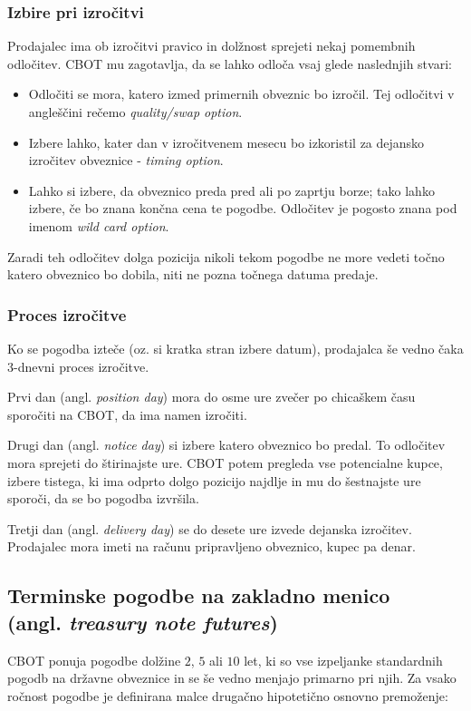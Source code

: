 \documentclass[a4paper, 11pt]{article}
\begin{document}
\subsubsection{Izbire pri izročitvi}
Prodajalec ima ob izročitvi pravico in dolžnost sprejeti nekaj pomembnih odločitev. CBOT mu 
zagotavlja, da se lahko odloča vsaj glede naslednjih stvari:

\begin{itemize}
    \item Odločiti se mora, katero izmed primernih obveznic bo izročil. Tej odločitvi v angleščini 
            rečemo \textit{quality/swap option}.
    \item Izbere lahko, kater dan v izročitvenem mesecu bo izkoristil za dejansko izročitev
            obveznice - \textit{timing option}.
    \item Lahko si izbere, da obveznico preda pred ali po zaprtju borze; tako lahko izbere, če 
            bo znana končna cena te pogodbe. Odločitev je pogosto znana pod imenom
             \textit{wild card option}. 
\end{itemize}

Zaradi teh odločitev dolga pozicija nikoli tekom pogodbe ne more vedeti točno katero obveznico bo
dobila, niti ne pozna točnega datuma predaje.

\subsubsection{Proces izročitve}
Ko se pogodba izteče (oz. si kratka stran izbere datum), prodajalca še vedno čaka 3-dnevni proces 
izročitve. 

Prvi dan (angl. \textit{position day}) mora do osme ure zvečer po chicaškem času sporočiti na 
CBOT, da ima namen izročiti. 

Drugi dan (angl. \textit{notice day}) si izbere katero obveznico bo predal. To odločitev mora 
sprejeti do štirinajste ure. CBOT potem pregleda vse potencialne kupce, izbere tistega, ki 
ima odprto dolgo pozicijo najdlje in mu do šestnajste ure sporoči, da se bo pogodba izvršila. 

Tretji dan (angl. \textit{delivery day}) se do desete ure izvede dejanska izročitev. Prodajalec 
mora imeti na računu pripravljeno obveznico, kupec pa denar. 


\subsection{Terminske pogodbe na zakladno menico \\ (angl. \textit{treasury note futures})}
CBOT ponuja pogodbe dolžine $2$, $5$ ali $10$ let, ki so vse izpeljanke standardnih pogodb na 
državne obveznice in se še vedno menjajo primarno pri njih. Za vsako ročnost pogodbe je 
definirana malce drugačno hipotetično osnovno premoženje:
\end{document}
